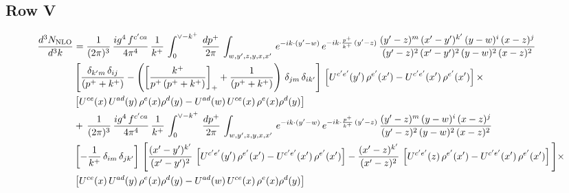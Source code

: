 \documentclass[9pt]{article}
\numberwithin{equation}{section}
\begin{document}
\subsection{Row V}
\begin{align}
    \frac{d^{3}N_{\rm NLO}}{d^{3}k} & =  \frac{1}{(2\pi)^{3}}\, \frac{ig^{4}\,f^{c'ca}}{4\pi^{4}}\, \frac{1}{k^{+}}\,\int_{0}^{\vee-k^{+}}\, \frac{dp^{+}}{2\pi}\, \int_{w,y',z,y,x,x'}\, e^{-ik\cdot (y'-w)}\, e^{-ik\cdot \frac{p^{+}}{k^{+}}\,(y'-z)}\,\frac{(y'-z)^{m}\,(x'-y')^{k'}\,(y-w)^{i}\,(x-z)^{j}}{(y'-z)^{2}\,(x'-y')^{2}\,(y-w)^{2}\,(x-z)^{2}}\notag \\ & \left[\frac{\delta_{k'm}\,\delta_{ij}}{(p^{+}+k^{+})}-\left(\left[\frac{k^{+}}{p^{+}\,(p^{+}+k^{+})}\right]_{+}+\frac{1}{(p^{+}+k^{+})}\right)\,\delta_{jm}\,\delta_{ik'}\right]\, \left[U^{c'e'}(y')\,\rho^{e'}(x')-U^{c'e'}(x')\,\rho^{e'}(x')\right]\times \notag \\ &  \left[U^{ce}(x)\,U^{ad}(y)\,\rho^{e}(x)\rho^{d}(y)-U^{ad}(w)\,U^{ce}(x)\,\rho^{e}(x)\rho^{d}(y)\right] \notag \\
&   +\,\frac{1}{(2\pi)^{3}}\, \frac{ig^{4}\,f^{c'ca}}{4\pi^{4}}\, \frac{1}{k^{+}}\,\int_{0}^{\vee-k^{+}}\, \frac{dp^{+}}{2\pi}\, \int_{w,y',z,y,x,x'}\, e^{-ik\cdot (y'-w)}\, e^{-ik\cdot \frac{p^{+}}{k^{+}}\,(y'-z)}\,\frac{(y'-z)^{m}\,(y-w)^{i}\,(x-z)^{j}}{(y'-z)^{2}\,(y-w)^{2}\,(x-z)^{2}}\notag \\ &   \left[-\frac{1}{k^{+}}\, \delta_{im}\, \delta_{jk'}\right]\, \Bigg[\frac{(x'-y')^{k'}}{(x'-y')^{2}}\,\left[U^{c'e'}(y')\,\rho^{e'}(x')-U^{c'e'}(x')\,\rho^{e'}(x')\right] -\frac{(x'-z)^{k'}}{(x'-z)^{2}}\,\left[U^{c'e'}(z)\,\rho^{e'}(x')-U^{c'e'}(x')\,\rho^{e'}(x')\right]\Bigg]\times\notag \\ &      \left[U^{ce}(x)\,U^{ad}(y)\,\rho^{e}(x)\rho^{d}(y)-U^{ad}(w)\,U^{ce}(x)\,\rho^{e}(x)\rho^{d}(y)\right] 
\end{align}
\end{document}
